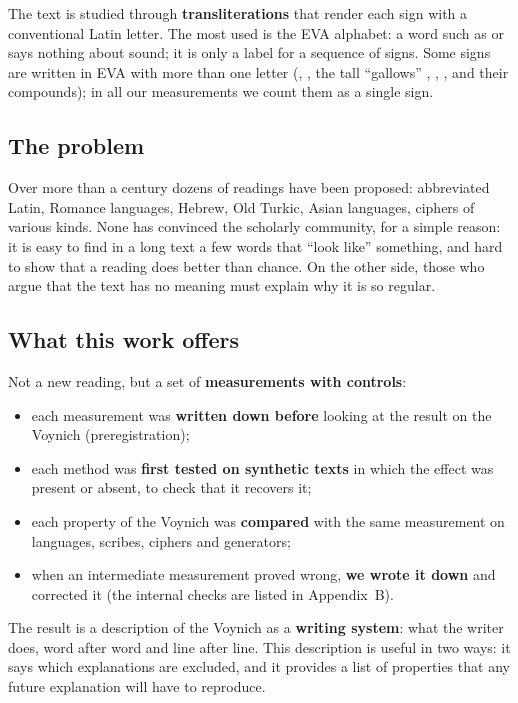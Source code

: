 The text is studied through \textbf{transliterations} that render each sign with a conventional Latin letter. The most
used is the EVA alphabet: a word such as  or  says nothing about sound; it is only a label for a
sequence of signs. Some signs are written in EVA with more than one letter (, , the tall ``gallows''
, , ,  and their compounds); in all our measurements we count them as a single sign.

\subsection{The problem}

Over more than a century dozens of readings have been proposed: abbreviated Latin, Romance languages, Hebrew, Old
Turkic, Asian languages, ciphers of various kinds. None has convinced the scholarly community, for a simple reason: it
is easy to find in a long text a few words that ``look like'' something, and hard to show that a reading does better
than chance. On the other side, those who argue that the text has no meaning must explain why it is so regular.

\subsection{What this work offers}

Not a new reading, but a set of \textbf{measurements with controls}:
\begin{itemize}
\item each measurement was \textbf{written down before} looking at the result on the Voynich (preregistration);
\item each method was \textbf{first tested on synthetic texts} in which the effect was present or absent, to check that
  it recovers it;
\item each property of the Voynich was \textbf{compared} with the same measurement on languages, scribes, ciphers and
  generators;
\item when an intermediate measurement proved wrong, \textbf{we wrote it down} and corrected it (the internal checks are
  listed in Appendix~B).
\end{itemize}
The result is a description of the Voynich as a \textbf{writing system}: what the writer does, word after word and line
after line. This description is useful in two ways: it says which explanations are excluded, and it provides a list of
properties that any future explanation will have to reproduce.

